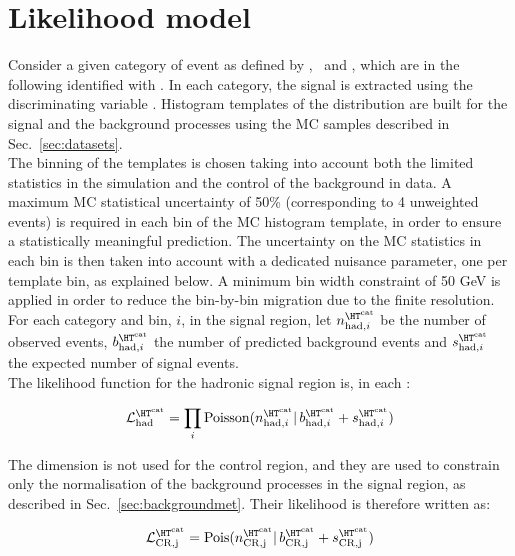 \section{Likelihood model}
\label{sec:likelihood}

Consider a given category of event as defined by \njet, \nb~and \scalht, which are in the following identified with \htcat. 
In each category, the signal is extracted using the discriminating variable \mht. 
Histogram templates of the \mht distribution are built for the signal and the background processes 
using the MC samples described in Sec.~\ref{sec:datasets}. \\
The binning of the templates is chosen taking into account both the limited statistics in the simulation and 
the control of the background in data. 
A maximum MC statistical uncertainty of 50\% (corresponding to 4 unweighted events) is required in each bin of the MC histogram template, 
in order to ensure a statistically meaningful prediction. The uncertainty on the MC statistics in each bin is then 
taken into account with a dedicated nuisance parameter, one per template bin, as explained below. 
A minimum bin width constraint of 50 GeV is applied
in order to reduce the bin-by-bin migration due to the finite \mht resolution.\\

For each category \htcat and \mht bin, $i$, in the signal region, let $n^{\htcat}_{\mathrm{had},i}$ be the number of observed events, 
$b^{\htcat}_{\mathrm{had},i}$ the number of predicted background events and $s^{\htcat}_{\mathrm{had},i}$ the expected number of signal events. \\
The likelihood function for the hadronic signal region is, in each \htcat:

\begin{equation}
\mathcal{L}^{\htcat}_{\mathrm{had}}=\prod_i \mathrm{Poisson}(n^{\htcat}_{\mathrm{had},i} |\, b^{\htcat}_{\mathrm{had},i} + s^{\htcat}_{\mathrm{had},i})
\label{eq:hadronicLikelihood}
\end{equation}

The \mht dimension is not used for the control region, and they are used to constrain only the normalisation of the background processes 
in the signal region, as described in Sec.~\ref{sec:backgroundmet}. 
Their likelihood is therefore written as:

\begin{equation}
\mathcal{L}^{\htcat}_{\mathrm{CR,j}}=\mathrm{Pois}(n^{\htcat}_{\mathrm{CR,j}} |\, b^{\htcat}_{\mathrm{CR,j}} + s^{\htcat}_{\mathrm{CR,j}})
\label{eq:controlLikelihood}
\end{equation}

